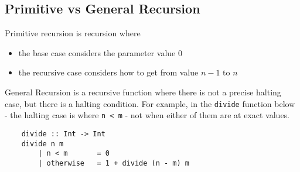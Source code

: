 \subsection{Primitive vs General Recursion}
Primitive recursion is recursion where 
\begin{itemize}
    \item the base case considers the parameter value 0
    \item the recursive case considers how to get from value $n - 1$ to $n$
\end{itemize}
General Recursion is a recursive function where there is not a precise halting case, but there is a halting condition. For example, in the \verb|divide| function below - the halting case is where \verb|n < m| - not when either of them are at exact values.
\begin{verbatim}
    divide :: Int -> Int
    divide n m
        | n < m       = 0
        | otherwise   = 1 + divide (n - m) m
\end{verbatim}
